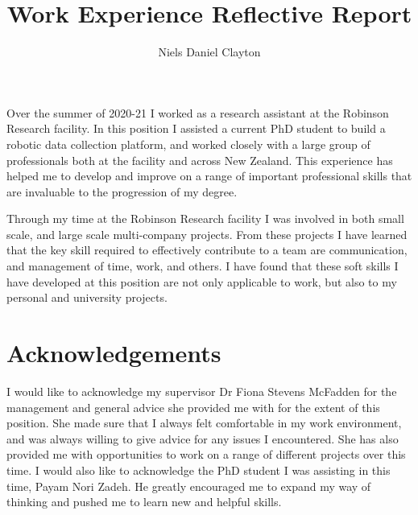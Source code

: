 \documentclass[11pt, a4paper, twoside, openright]{report}
\title{Work Experience Reflective Report}
\author{Niels Daniel Clayton}
\date{}
\begin{document}
\begin{summary}
    
    Over the summer of 2020-21 I worked as a research assistant at the Robinson Research facility. In this position I assisted a current PhD student to build a robotic data collection platform, and worked closely with a large group of professionals both at the facility and across New Zealand. This experience has helped me to develop and improve on a range of important professional skills that are invaluable to the progression of my degree.
    
    Through my time at the Robinson Research facility I was involved in both small scale, and large scale multi-company projects. From these projects I have learned that the key skill required to effectively contribute to a team are communication, and management of time, work, and others. I have found that these soft skills I have developed at this position are not only applicable to work, but also to my personal and university projects.   

\end{summary}

\frontmatter


\maketitle

\tableofcontents

\vfill

\section*{Acknowledgements}

I would like to acknowledge my supervisor Dr Fiona Stevens McFadden for the management and general advice she provided me with for the extent of this position. She made sure that I always felt comfortable in my work environment, and was always willing to give advice for any issues I encountered. She has also provided me with opportunities to work on a range of different projects over this time. I would also like to acknowledge the PhD student I was assisting in this time, Payam Nori Zadeh. He greatly encouraged me to expand my way of thinking and pushed me to learn new and helpful skills.  

\end{document}
